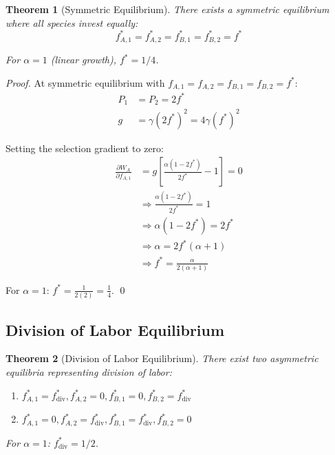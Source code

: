 \documentclass[11pt]{article}
\newtheorem{theorem}{Theorem}
\theoremstyle{definition}
\theoremstyle{remark}
\newcommand{\pd}[2]{\frac{\partial #1}{\partial #2}}
\begin{document}
\begin{theorem}[Symmetric Equilibrium]
There exists a symmetric equilibrium where all species invest equally:
$$f_{A,1}^* = f_{A,2}^* = f_{B,1}^* = f_{B,2}^* = f^*$$

For $\alpha = 1$ (linear growth), $f^* = 1/4$.
\end{theorem}

\begin{proof}
At symmetric equilibrium with $f_{A,1} = f_{A,2} = f_{B,1} = f_{B,2} = f^*$:
\begin{align}
P_1 &= P_2 = 2f^*\\
g &= \gamma (2f^*)^2 = 4\gamma (f^*)^2
\end{align}

Setting the selection gradient to zero:
\begin{align}
\pd{W_A}{f_{A,1}} &= g \left[ \frac{\alpha(1 - 2f^*)}{2f^*} - 1 \right] = 0\\
&\Rightarrow \frac{\alpha(1 - 2f^*)}{2f^*} = 1\\
&\Rightarrow \alpha(1 - 2f^*) = 2f^*\\
&\Rightarrow \alpha = 2f^*(\alpha + 1)\\
&\Rightarrow f^* = \frac{\alpha}{2(\alpha + 1)}
\end{align}

For $\alpha = 1$: $f^* = \frac{1}{2(2)} = \frac{1}{4}$. \qed
\end{proof}

\subsection{Division of Labor Equilibrium}

\begin{theorem}[Division of Labor Equilibrium]
There exist two asymmetric equilibria representing division of labor:
\begin{enumerate}
    \item $f_{A,1}^* = f^*_{\text{div}}, f_{A,2}^* = 0, f_{B,1}^* = 0, f_{B,2}^* = f^*_{\text{div}}$
    \item $f_{A,1}^* = 0, f_{A,2}^* = f^*_{\text{div}}, f_{B,1}^* = f^*_{\text{div}}, f_{B,2}^* = 0$
\end{enumerate}

For $\alpha = 1$: $f^*_{\text{div}} = 1/2$.
\end{theorem}
\end{document}
